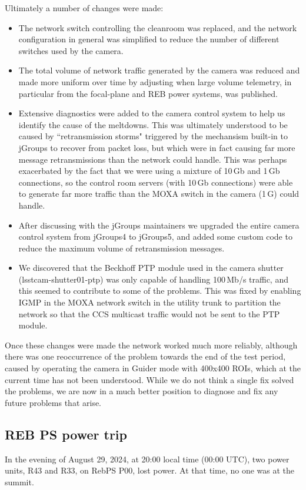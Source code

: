 Ultimately a number of changes were made:

\begin{itemize}
\item The network switch controlling the cleanroom was replaced, and the network configuration in general was simplified to reduce the number of different switches used by the camera.
\item The total volume of network traffic generated by the camera was reduced and made more uniform over time by adjusting when large volume telemetry, in particular from the focal-plane and REB power systems, was published.
\item Extensive diagnostics were added to the camera control system to help us identify the cause of the meltdowns. This was ultimately understood to be caused by ``retransmission storms" triggered by the mechansism built-in to jGroups to recover from packet loss, but which were in fact causing far more message retransmissions than the network could handle. This was perhaps exacerbated by the fact that we were using a mixture of 10\,Gb and 1\,Gb connections, so the control room servers (with 10\,Gb connections) were able to generate far more traffic than the MOXA switch in the camera (1\,G) could handle.
\item After discussing with the jGroups maintainers we upgraded the entire camera control system from jGroups4 to jGroups5, and added some custom code to reduce the maximum volume of retransmission messages.
\item We discovered that the Beckhoff PTP module used in the camera shutter (lsstcam-shutter01-ptp) was only capable of handling 100\,Mb/s traffic, and this seemed to contribute to some of the problems. This was fixed by enabling IGMP in the MOXA network switch in the utility trunk to partition the network so that the CCS multicast traffic would not be sent to the PTP module.
\end{itemize}

Once these changes were made the network worked much more reliably, although there was one reoccurrence of the problem towards the end of the test period, caused by operating the camera in Guider mode with 400x400 ROIs, which at the current time has not been understood. While we do not think a single fix solved the problems, we are now in a much better position to diagnose and fix any future problems that arise.

\clearpage
\subsection{REB PS power trip}\label{sec:rebpstripped}
In the evening of August 29, 2024, at 20:00 local time (00:00 UTC), two power units, R43 and R33, on RebPS P00, lost power. At that time, no one was at the summit.

